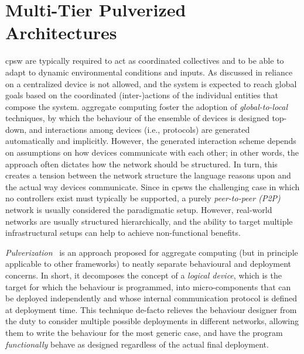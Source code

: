 \chapter{Multi-Tier Pulverized Architectures}
\minitoc%
%
\newcommand{\scalaloci}{{ScalaLoci}}
\newcommand{\scafiloci}{{ScaFiLoci}}
\newcommand{\scalainline}[1]{\texttt{#1}}
\ac{cpsw} are typically required 
 to act as coordinated collectives
 and to be able to adapt to dynamic
 environmental conditions and inputs.
%
%
As discussed in  reliance on a centralized device is not allowed,
and the system is expected to reach global goals based 
 on the coordinated (inter-)actions of the individual entities that compose the system.
%
aggregate computing foster the adoption of \emph{global-to-local} techniques,
by which the behaviour of the ensemble of devices is designed top-down,
and interactions among devices (i.e., protocols) are generated automatically and implicitly.
%
However, the generated interaction scheme depends on assumptions on how devices communicate with each other;
in other words, the approach often dictates how the network should be structured.
%
In turn, this creates a tension between the network structure the language reasons upon and the actual way devices communicate.
%
Since in \acp{cpsw} the challenging case in which no controllers exist must typically be supported, a purely \emph{peer-to-peer (P2P)} network is usually considered the paradigmatic setup.
%
However, real-world networks are usually structured hierarchically, and the ability to target multiple infrastructural setups can help to achieve non-functional benefits.

\emph{Pulverization}~\cite{DBLP:journals/fi/CasadeiPPVW20}
is an approach proposed for aggregate computing (but in principle applicable to other frameworks) to neatly separate behavioural and deployment concerns.
%
In short, it decomposes the concept of a \emph{logical device}, which is the target for which the behaviour is programmed,
into micro-components that can be deployed independently
and whose internal communication protocol is defined at deployment time.
%
This technique de-facto relieves the behaviour designer from the duty to consider multiple possible deployments in different networks,
allowing them to write the behaviour for the most generic case, and have the program \emph{functionally} behave as designed regardless of the actual final deployment.


